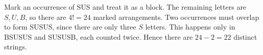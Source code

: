 Mark an occurrence of SUS and treat it as a block. The remaining letters are $S,U,B$, so there are $4!=24$ marked arrangements. Two occurrences must overlap to form SUSUS, since there are only three $S$ letters. This happens only in BSUSUS and SUSUSB, each counted twice. Hence there are $24-2=\boxed{22}$ distinct strings.
